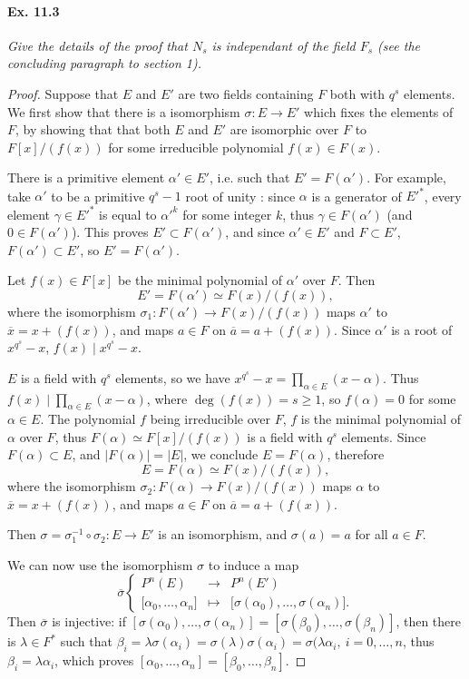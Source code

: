\documentclass[11pt,a4paper]{article}
\begin{document}
\paragraph{Ex. 11.3}{\it Give the details of the proof that $N_s$ is independant of the field $F_s$ (see the concluding paragraph to section 1).
}
\begin{proof}
Suppose that $E$ and $E'$ are two fields containing $F$ both with $q^s$ elements. We first show that there is a isomorphism $\sigma : E \to E'$ which fixes the elements of $F$, by showing that that both $E$ and $E'$ are isomorphic over $F$ to $F[x]/(f(x))$ for some irreducible polynomial $f(x) \in F(x)$.

There is a primitive element $\alpha' \in E'$, i.e. such that $E' = F(\alpha')$. For example, take $\alpha'$ to be a primitive $q^s - 1$ root of unity : since $\alpha$ is a generator of $E'^*$, every element $\gamma \in E'^*$ is equal to $\alpha'^k$ for some integer $k$, thus $\gamma \in F(\alpha')$ (and $0 \in F(\alpha')$). This proves $E' \subset F(\alpha')$, and since $\alpha' \in E'$ and $F \subset E'$, $F(\alpha') \subset E'$, so $E' = F(\alpha')$.

Let $f(x) \in F[x]$ be the minimal polynomial of $\alpha'$ over $F$. Then
$$E' = F(\alpha') \simeq F(x)/(f(x)),$$
where the isomorphism $\sigma_1 : F(\alpha') \to F(x)/(f(x))$ maps $\alpha'$ to $\overline{x} = x + (f(x))$, and maps $a \in F$ on $\overline{a} = a + (f(x))$.
Since $\alpha'$ is a root of $x^{q^s} -x$, $f(x) \mid x^{q^s} - x$. 

 $E$ is a field with $q^s$ elements, so we have $x^{q^s} - x = \prod_{\alpha \in E} (x-\alpha)$. Thus $f(x) \mid \prod_{\alpha \in E} (x-\alpha)$, where $\deg(f(x)) = s \geq 1$, so $f(\alpha) = 0$ for some $\alpha \in E$. The polynomial $f$ being irreducible over $F$, $f$ is the minimal polynomial of $\alpha$ over $F$, thus $F(\alpha) \simeq F[x]/(f(x))$ is a field with $q^s$ elements. 
 Since $F(\alpha) \subset E$, and $|F(\alpha)| = |E|$, we conclude $E = F(\alpha)$, therefore
$$E = F(\alpha) \simeq F(x)/(f(x)),$$
where the isomorphism $\sigma_2 : F(\alpha) \to F(x)/(f(x))$ maps $\alpha$ to $\overline{x} = x + (f(x))$, and maps $a \in F$ on $\overline{a} = a + (f(x))$.

Then  $\sigma = \sigma_1^{-1} \circ \sigma_2 : E \to E'$ is an isomorphism, and $\sigma(a) = a$ for all $a \in F$.
 
 \bigskip
 
 We can now use the isomorphism $\sigma$ to induce a map 
 $$\overline{\sigma}
 \left\{
 \begin{array}{ccl}
 P^n(E)& \to &P^n(E')\\
 {[}\alpha_0,\ldots,\alpha_n{]} &\mapsto & {[}\sigma(\alpha_0),\ldots,\sigma(\alpha_n){]}.
 \end{array}
 \right.
 $$
 Then $\overline{\sigma}$ is injective: if $[\sigma(\alpha_0),\ldots,\sigma(\alpha_n)] = [\sigma(\beta_0),\ldots,\sigma(\beta_n)]$, then there is $\lambda \in F^*$ such that $\beta_i = \lambda \sigma(\alpha_i) = \sigma(\lambda)\sigma(\alpha_i) = \sigma(\lambda \alpha_i,\ i = 0,\ldots,n$, thus $\beta_i = \lambda \alpha_i$, which proves $[\alpha_0,\ldots,\alpha_n] = [\beta_0,\ldots,\beta_n]$.
 

\end{proof}
\end{document}
